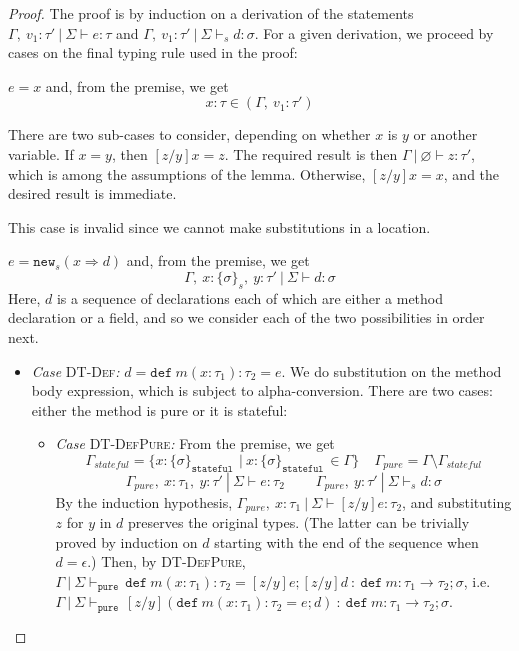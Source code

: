 \documentclass{llncs}
\newcommand{\keywadj}[1]{\mathtt{#1}}
\newcommand{\keyw}[1]{\keywadj{#1}~}
\newcommand{\pcase}[1][]{
  \if\relax\detokenize{#1}\relax
    \def\thiscase{}
  \else
    \def\thiscase{~#1}
  \fi
  \item
}
\begin{document}
\begin{proof} The proof is by induction on a derivation of the statements $\Gamma,~v_1 : \tau'~|~\Sigma \vdash e : \tau$ and $\Gamma,~v_1 : \tau'~|~\Sigma \vdash_s d : \sigma$. For a given derivation, we proceed by cases on the final typing rule used in the proof:

\begin{pcases}
\pcase[\textsc{T-Var}]
$e = x$ and, from the premise, we get 
\[
x : \tau \in (\Gamma,~v_1 : \tau')
\]

There are two sub-cases to consider, depending on whether $x$ is $y$ or another variable. If $x = y$, then $[z/y]x = z$. The required result is then $\Gamma~|~\varnothing \vdash z : \tau'$, which is among the assumptions of the lemma. Otherwise, $[z/y]x = x$, and the desired result is immediate.
\\
\pcase[\textsc{T-Loc}] This case is invalid since we cannot make substitutions in a location.
\\
\pcase[\textsc{T-New}]
$e = \keywadj{new}_{s}(x \Rightarrow d)$ and, from the premise, we get
\[
\Gamma,~x : \{ \sigma \}_{s},~y : \tau'~|~\Sigma \vdash d : \sigma
\]
Here, $d$ is a sequence of declarations each of which are either a method declaration or a field, and so we consider each of the two possibilities in order next.
\\
\begin{itemize}
\item[] \textit{Case} \textsc{DT-Def}\textit{:} $d = \keyw{def} m(x : \tau_1) : \tau_2 = e$. We do substitution on the method body expression, which is subject to alpha-conversion. There are two cases: either the method is pure or it is stateful:
\\
\begin{itemize}
\item[] \textit{Case} \textsc{DT-DefPure}\textit{:} From the premise, we get
\[
\Gamma_{stateful} = \{x : \{ \sigma \}_{\keyw{stateful}} ~|~ x : \{ \sigma \}_{\keyw{stateful}} \in \Gamma\}~~~~~\Gamma_{pure} = \Gamma \setminus \Gamma_{stateful}
\]\[
\Gamma_{pure},~x : \tau_1,~y : \tau'~|~\Sigma \vdash e : \tau_2~~~~~~~~~~\Gamma_{pure},~y : \tau'~|~\Sigma \vdash_s d : \sigma
\]
By the induction hypothesis, $\Gamma_{pure},~x : \tau_1~|~\Sigma \vdash [z/y]e : \tau_2$, and substituting $z$ for $y$ in $d$ preserves the original types. (The latter can be trivially proved by induction on $d$ starting with the end of the sequence when $d = \epsilon$.) Then, by \textsc{DT-DefPure}, $\Gamma~|~\Sigma \vdash_{\keyw{pure}} \keyw{def} m(x : \tau_1) : \tau_2 = [z/y]e; [z/y]d~:~\keyw{def} m : \tau_1 \rightarrow \tau_2; \sigma$, i.e. $\Gamma~|~\Sigma \vdash_{\keyw{pure}} [z/y](\keyw{def} m(x : \tau_1) : \tau_2 = e; d)~:~\keyw{def} m : \tau_1 \rightarrow \tau_2; \sigma$.

\end{itemize}
\end{itemize}
\end{pcases}
\end{proof}
\end{document}
